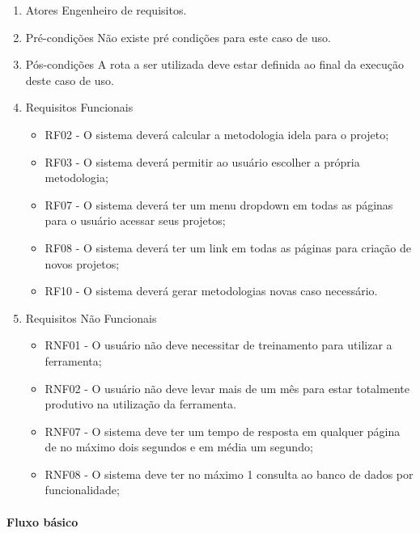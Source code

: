 \begin{enumerate}
	\item Atores
		Engenheiro de requisitos. 
	\item Pré-condições
		Não existe pré condições para este caso de uso.
	\item Pós-condições
		A rota a ser utilizada deve estar definida ao final da execução deste caso de uso.
	\item Requisitos Funcionais
		\begin{itemize}
			\item RF02 - O sistema deverá calcular a metodologia idela para o projeto;
			\item RF03 - O sistema deverá permitir ao usuário escolher a própria metodologia;
			\item RF07 - O sistema deverá ter um menu dropdown em todas as páginas para o usuário acessar seus projetos;
			\item RF08 - O sistema deverá ter um link em todas as páginas para criação de novos projetos;
			\item RF10 - O sistema deverá gerar metodologias novas caso necessário.
		\end{itemize}
	\item Requisitos Não Funcionais
		\begin{itemize}
			\item RNF01 - O usuário não deve necessitar de treinamento para utilizar a ferramenta;
			\item RNF02 - O usuário não deve levar mais de um mês para estar totalmente produtivo na utilização da ferramenta.
			\item RNF07 - O sistema deve ter um tempo de resposta em qualquer página de no máximo dois segundos e em média um segundo;
			\item RNF08 - O sistema deve ter no máximo 1 consulta ao banco de dados por funcionalidade;
		\end{itemize}
\end{enumerate}

\paragraph{Fluxo básico}

